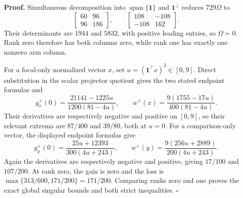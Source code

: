 \textbf{Proof.}
Simultaneous decomposition into \(\operatorname{span}\{\mathbf1\}\) and \(\mathbf1^\perp\) reduces \(729\Omega\) to
\[
\begin{bmatrix}60&96\\96&186\end{bmatrix},
\qquad
\begin{bmatrix}108&-108\\-108&162\end{bmatrix}.
\]
Their determinants are \(1944\) and \(5832\), with positive leading entries, so \(\Omega\succ0\).  Rank zero therefore has both columns zero, while rank one has exactly one nonzero arm column.

For a focal-only normalized vector \(x\), set \(u=(\mathbf1^{\top}x)^2\in[0,9]\).  Direct substitution in the scalar projector quotient gives the two stated endpoint formulas and
\[
g_x^+(0)=\frac{21141-1225u}{1200(81-4u)},
\qquad
w^+(x)=\frac{9(1755-17u)}{400(81-4u)}.
\tag{1}
\]
Their derivatives are respectively negative and positive on \([0,9]\), so their relevant extrema are \(87/400\) and \(39/80\), both at \(u=0\).  For a comparison-only vector, the displayed endpoint formulas give
\[
g_y^+(0)=\frac{25u+12393}{300(4u+243)},
\qquad
w^+(y)=\frac{9(256u+2889)}{200(4u+243)}.
\tag{2}
\]
Again the derivatives are respectively negative and positive, giving \(17/100\) and \(107/200\).  At rank zero, the gain is zero and the loss is \(\max\{313/600,171/200\}=171/200\).  Comparing ranks zero and one proves the exact global singular bounds and both strict inequalities. \(\square\)